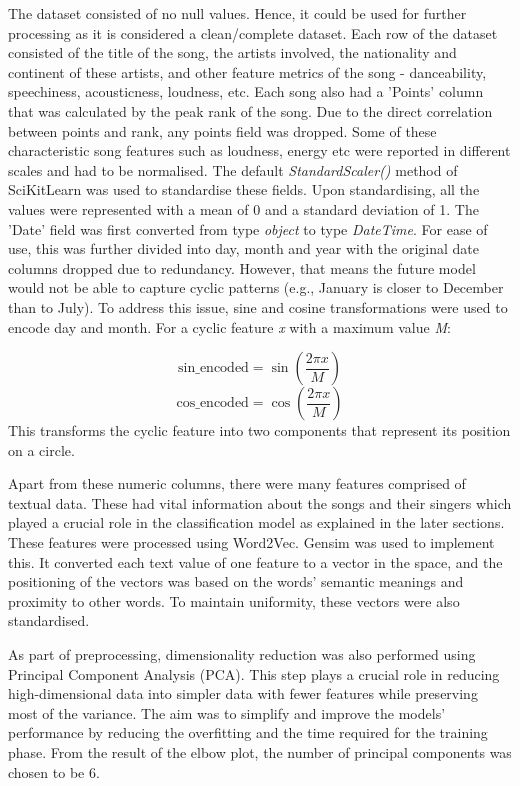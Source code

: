 \documentclass{article}
\begin{document}
The dataset consisted of no null values. Hence, it could be used for further processing as it is considered a clean/complete dataset. Each row of the dataset consisted of the title of the song, the artists involved, the nationality and continent of these artists, and other feature metrics of the song - danceability, speechiness, acousticness, loudness, etc. Each song also had a 'Points' column that was calculated by the peak rank of the song. Due to the direct correlation between points and rank, any points field was dropped. Some of these characteristic song features such as loudness, energy etc were reported in different scales and had to be normalised. The default \textit{StandardScaler()} method of SciKitLearn was used to standardise these fields. Upon standardising, all the values were represented with a mean of 0 and a standard deviation of 1.  The 'Date' field was first converted from type \textit{object} to type \textit{DateTime}. For ease of use, this was further divided into day, month and year with the original date columns dropped due to redundancy. However, that means the future model would not be able to capture cyclic patterns (e.g., January is closer to December than to July). To address this issue, sine and cosine transformations were used to encode day and month. For a cyclic feature \textit{x} with a maximum value \textit{M}:

\[
\text{sin\_encoded} = \sin\left(\frac{2\pi x}{M}\right)
\]
\[
\text{cos\_encoded} = \cos\left(\frac{2\pi x}{M}\right)
\]
This transforms the cyclic feature into two components that represent its position on a circle.

Apart from these numeric columns, there were many features comprised of textual data. These had vital information about the songs and their singers which played a crucial role in the classification model as explained in the later sections. These features were processed using Word2Vec. Gensim was used to implement this. It converted each text value of one feature to a vector in the space, and the positioning of the vectors was based on the words' semantic meanings and proximity to other words. To maintain uniformity, these vectors were also standardised. 

As part of preprocessing, dimensionality reduction was also performed using Principal Component Analysis (PCA). This step plays a crucial role in reducing high-dimensional data into simpler data with fewer features while preserving most of the variance. The aim was to simplify and improve the models' performance by reducing the overfitting and the time required for the training phase. From the result of the elbow plot, the number of principal components was chosen to be 6. 
\end{document}
